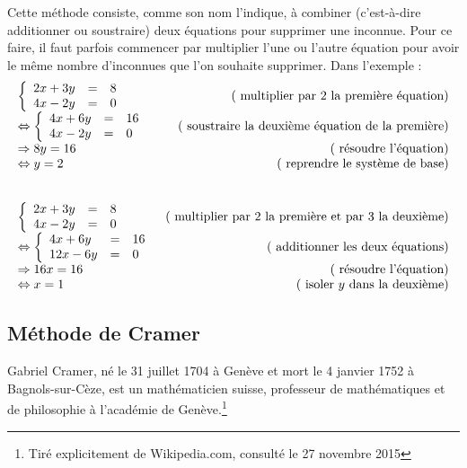 Cette méthode consiste, comme son nom l'indique, à combiner (c'est-à-dire additionner ou soustraire) deux équations pour supprimer une inconnue. Pour ce faire, il faut parfois commencer par multiplier l'une ou l'autre équation pour avoir le même nombre d'inconnues que l'on souhaite supprimer. Dans l'exemple :
$$
\begin{array}{lr}
\left\{
\begin{array}{lll}
2x+3y &=& 8\\
4x-2y &=& 0
\end{array}
\right.
&(\mbox{ multiplier par }2\mbox{ la première équation}) \\
\Leftrightarrow 
\left\{
\begin{array}{lll}
4x+6y &=& 16\\
4x-2y &=& 0
\end{array}
\right.
&(\mbox{ soustraire la deuxième équation de la première}) \\
\Rightarrow
8y = 16
&(\mbox{ résoudre l'équation}) \\
\Leftrightarrow
y = 2
&(\mbox{ reprendre le système de base}) \\
&\\
&\\
\left\{
\begin{array}{lll}
2x+3y &=& 8\\
4x-2y &=& 0
\end{array}
\right.
&(\mbox{ multiplier par }2\mbox{ la première et par }3\mbox{ la deuxième}) \\
\Leftrightarrow
\left\{
\begin{array}{lll}
4x+6y &=& 16\\
12x-6y &=& 0
\end{array}
\right.
&(\mbox{ additionner les deux équations}) \\
\Rightarrow
16x = 16
&(\mbox{ résoudre l'équation}) \\
\Leftrightarrow
x = 1
&(\mbox{ isoler }y\mbox{ dans la deuxième}) \\
\end{array}
$$

\subsection{Méthode de Cramer}

Gabriel Cramer, né le 31 juillet 1704 à Genève et mort le 4 janvier 1752 à Bagnols-sur-Cèze, est un mathématicien suisse, professeur de mathématiques et de philosophie à l'académie de Genève.\footnote{Tiré explicitement de Wikipedia.com, consulté le 27 novembre 2015}

